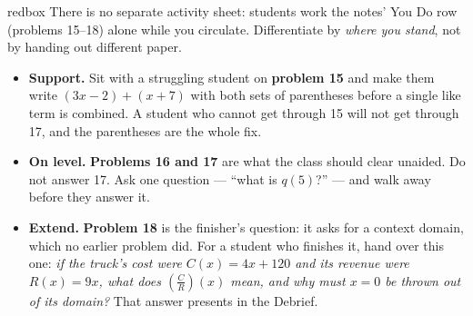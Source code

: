 \documentclass[10pt]{article}
\begin{document}
\begin{skillbox}{redbox}
There is no separate activity sheet: students work the notes' You Do row
(problems 15--18) alone while you circulate. Differentiate by \textit{where you
stand}, not by handing out different paper.

\begin{itemize}
  \item \textbf{Support.} Sit with a struggling student on \textbf{problem 15}
        and make them write $(3x - 2) + (x + 7)$ with both sets of parentheses
        before a single like term is combined. A student who cannot get through
        15 will not get through 17, and the parentheses are the whole fix.
  \item \textbf{On level.} \textbf{Problems 16 and 17} are what the class should
        clear unaided. Do not answer 17. Ask one question --- ``what is $q(5)$?''
        --- and walk away before they answer it.
  \item \textbf{Extend.} \textbf{Problem 18} is the finisher's question: it asks
        for a context domain, which no earlier problem did. For a student who
        finishes it, hand over this one: \textit{if the truck's cost were
        $C(x) = 4x + 120$ and its revenue were $R(x) = 9x$, what does
        $\left(\frac{C}{R}\right)(x)$ mean, and why must $x = 0$ be thrown out of
        its domain?} That answer presents in the Debrief.
\end{itemize}
\end{skillbox}
\end{document}
